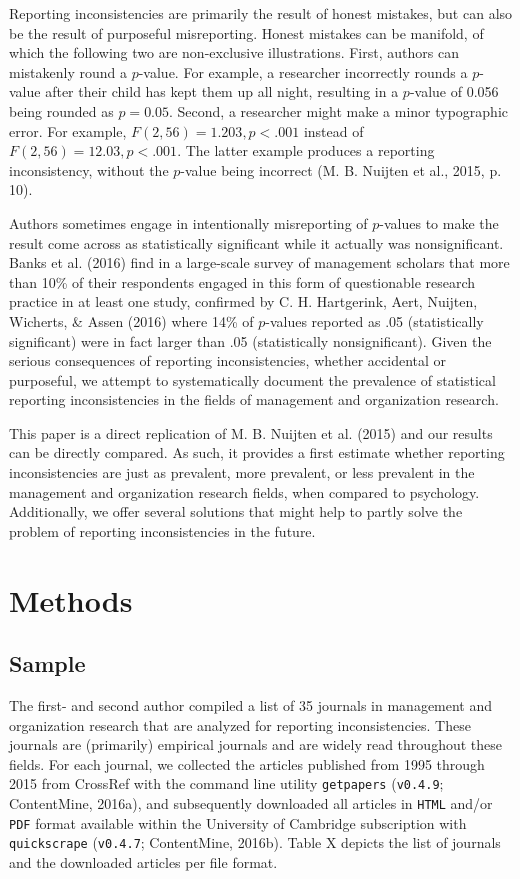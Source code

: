 \documentclass[english,floatsintext,man]{apa6}
\newcounter{author}
\begin{document}
Reporting inconsistencies are primarily the result of honest mistakes,
but can also be the result of purposeful misreporting. Honest mistakes
can be manifold, of which the following two are non-exclusive
illustrations. First, authors can mistakenly round a \(p\)-value. For
example, a researcher incorrectly rounds a \(p\)-value after their child
has kept them up all night, resulting in a \(p\)-value of 0.056 being
rounded as \(p=0.05\). Second, a researcher might make a minor
typographic error. For example, \(F(2,56)=1.203,p<.001\) instead of
\(F(2,56)=12.03,p<.001\). The latter example produces a reporting
inconsistency, without the \(p\)-value being incorrect (M. B. Nuijten et
al., 2015, p. 10).

Authors sometimes engage in intentionally misreporting of \(p\)-values
to make the result come across as statistically significant while it
actually was nonsignificant. Banks et al. (2016) find in a large-scale
survey of management scholars that more than 10\% of their respondents
engaged in this form of questionable research practice in at least one
study, confirmed by C. H. Hartgerink, Aert, Nuijten, Wicherts, \& Assen
(2016) where 14\% of \(p\)-values reported as .05 (statistically
significant) were in fact larger than .05 (statistically
nonsignificant). Given the serious consequences of reporting
inconsistencies, whether accidental or purposeful, we attempt to
systematically document the prevalence of statistical reporting
inconsistencies in the fields of management and organization research.

This paper is a direct replication of M. B. Nuijten et al. (2015) and
our results can be directly compared. As such, it provides a first
estimate whether reporting inconsistencies are just as prevalent, more
prevalent, or less prevalent in the management and organization research
fields, when compared to psychology. Additionally, we offer several
solutions that might help to partly solve the problem of reporting
inconsistencies in the future.

\section{Methods}\label{methods}

\subsection{Sample}\label{sample}

The first- and second author compiled a list of 35 journals in
management and organization research that are analyzed for reporting
inconsistencies. These journals are (primarily) empirical journals and
are widely read throughout these fields. For each journal, we collected
the articles published from 1995 through 2015 from CrossRef with the
command line utility \texttt{getpapers} (\texttt{v0.4.9}; ContentMine,
2016a), and subsequently downloaded all articles in \texttt{HTML} and/or
\texttt{PDF} format available within the University of Cambridge
subscription with \texttt{quickscrape} (\texttt{v0.4.7}; ContentMine,
2016b). Table X depicts the list of journals and the downloaded articles
per file format.
\end{document}
